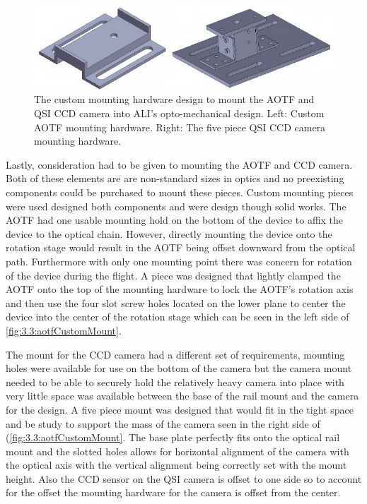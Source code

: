 \begin{figure}[h!]
        \includegraphics[width=\textwidth]{./Images/3-3-CustomMountingPieces.pdf}
        \caption[ALI Custom Mounting Hardware]{The custom mounting hardware design to mount the AOTF and QSI CCD camera into ALI's opto-mechanical design. Left: Custom AOTF mounting hardware. Right: The five piece QSI CCD camera mounting hardware.}
        \label{fig:3.3:aotfCustomMount}
\end{figure}

Lastly, consideration had to be given to mounting the AOTF and CCD camera. Both of these elements are are non-standard sizes in optics and no preexisting components could be purchased to mount these pieces. Custom mounting pieces were used designed both components and were design though solid works. The AOTF had one usable mounting hold on the bottom of the device to affix the device to the optical chain. However, directly mounting the device onto the rotation stage would result in the AOTF being offset downward from the optical path. Furthermore with only one mounting point there was concern for rotation of the device during the flight. A piece was designed that lightly clamped the AOTF onto the top of the mounting hardware to lock the AOTF's rotation axis and then use the four slot screw holes located on the lower plane to center the device into the center of the rotation stage which can be seen in the left side of \autoref{fig:3.3:aotfCustomMount}.
 
The mount for the CCD camera had a different set of requirements, mounting holes were available for use on the bottom of the camera but the camera mount needed to be able to securely hold the relatively heavy camera into place with very little space was available between the base of the rail mount and the camera for the design. A five piece mount was designed that would fit in the tight space and be study to support the mass of the camera seen in the right side of (\autoref{fig:3.3:aotfCustomMount}. The base plate perfectly fits onto the optical rail mount and the slotted holes allows for horizontal alignment of the camera with the optical axis with the vertical alignment being correctly set with the mount height. Also the CCD sensor on the QSI camera is offset to one side so to account for the offset the mounting hardware for the camera is offset from the center.


